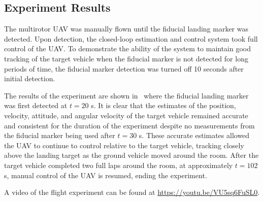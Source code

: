 
\subsection{Experiment Results}
The multirotor UAV was manually flown until the
fiducial landing marker was detected. Upon detection, the closed-loop estimation
and control system took full control of the UAV. To demonstrate the ability of the
system to maintain good tracking of the target vehicle when the fiducial
marker is not detected for long periods of time, the fiducial marker detection
was turned off 10 seconds after initial detection.

The results of the experiment are shown in~ where the
fiducial landing marker was first detected at $t = 20$ s.
It is clear that the estimates of the position, velocity, attitude, and angular
velocity of the target vehicle remained accurate and consistent for the duration
of the experiment despite no measurements from the fiducial marker being used
after $t = 30$ s.
These accurate estimates allowed
the UAV to continue to control relative to the target vehicle, tracking closely
above the landing target as the ground vehicle moved around the room. After the
target vehicle completed two full laps around the room,
at approximately $t=102$ s, manual control of the UAV is resumed, ending the experiment.

A video of the flight experiment can be found at
\url{https://youtu.be/VU5sq6FuSL0}.

